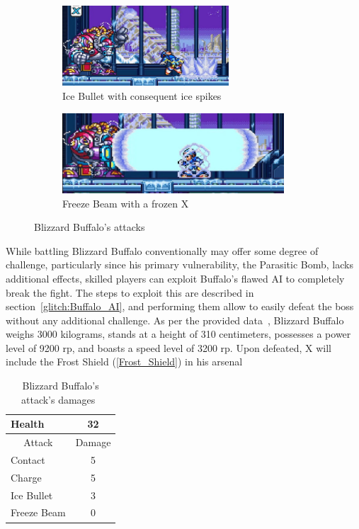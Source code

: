 \begin{figure}[htp]
	\ContinuedFloat
	\centering
	\begin{subfigure}{\linewidth}
		\centering
		\includegraphics[height=3cm]{figures/X3/Blizzard_buffalo/Buffalo_shield.jpg}
		\caption{Ice Bullet with consequent ice spikes}
	\end{subfigure}
	\begin{subfigure}{\linewidth}
		\centering
		\includegraphics[height=3cm]{figures/X3/Blizzard_buffalo/Buffalo_beam.jpg}
		\caption{Freeze Beam with a frozen X}
	\end{subfigure}
	\caption{Blizzard Buffalo's attacks}
\end{figure}

While battling Blizzard Buffalo conventionally may offer some degree of challenge, particularly since his primary vulnerability, the Parasitic Bomb, lacks additional effects, skilled players can exploit Buffalo's flawed AI to completely break the fight. The steps to exploit this  are described in section~\ref{glitch:Buffalo_AI}, and performing them allow to easily defeat the boss without any additional challenge.
As per the provided data~\cite{wayback:X3_resources}, Blizzard Buffalo weighs 3000 kilograms, stands at a height of 310 centimeters, possesses a power level of 9200 rp, and boasts a speed level of 3200 rp. Upon defeated, X will include the Frost Shield (\ref{Frost_Shield}) in his arsenal

\begin{table}[htp]
	\centering
	\begin{tabular}[h]{l c}
		\toprule
		Health  & 32\\
		\midrule
		\multicolumn{1}{c}{Attack} & \multicolumn{1}{c}{Damage}\\
		Contact & 5\\
		Charge & 5\\
		Ice Bullet& 3\\
		Freeze Beam& 0\\
		\bottomrule
	\end{tabular}
	\caption{Blizzard Buffalo's attack's damages~\cite{wiki:Blizzard_buffalo,book:Compendium}}
\end{table} 

